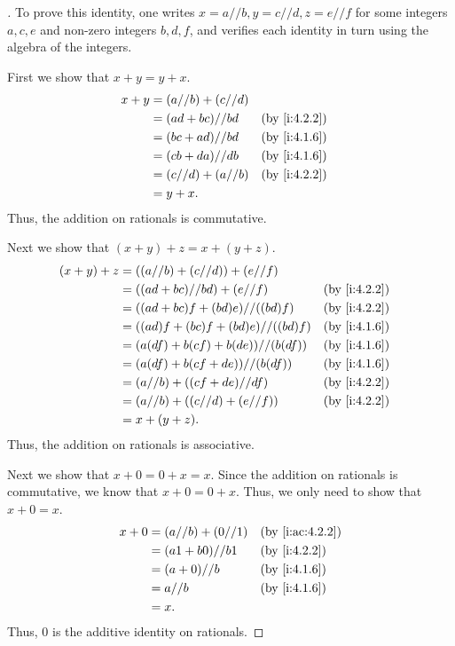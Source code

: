 \begin{proof}[]
  To prove this identity, one writes \(x = a // b, y = c // d, z = e // f\) for some integers \(a, c, e\) and non-zero integers \(b, d, f\), and verifies each identity in turn using the algebra of the integers.

  First we show that \(x + y = y + x\).
  \begin{align*}
    x + y & = (a // b) + (c // d)                   \\
          & = (ad + bc) // bd     &  & \by{i:4.2.2} \\
          & = (bc + ad) // bd     &  & \by{i:4.1.6} \\
          & = (cb + da) // db     &  & \by{i:4.1.6} \\
          & = (c // d) + (a // b) &  & \by{i:4.2.2} \\
          & = y + x.
  \end{align*}
  Thus, the addition on rationals is commutative.

  Next we show that \((x + y) + z = x + (y + z)\).
  \begin{align*}
    (x + y) + z & = ((a // b) + (c // d)) + (e // f)                     \\
                & = ((ad + bc) // bd) + (e // f)       &  & \by{i:4.2.2} \\
                & = ((ad + bc)f + (bd)e) // ((bd)f)    &  & \by{i:4.2.2} \\
                & = ((ad)f + (bc)f + (bd)e) // ((bd)f) &  & \by{i:4.1.6} \\
                & = (a(df) + b(cf) + b(de)) // (b(df)) &  & \by{i:4.1.6} \\
                & = (a(df) + b(cf + de)) // (b(df))    &  & \by{i:4.1.6} \\
                & = (a // b) + ((cf + de) // df)       &  & \by{i:4.2.2} \\
                & = (a // b) + ((c // d) + (e // f))   &  & \by{i:4.2.2} \\
                & = x + (y + z).
  \end{align*}
  Thus, the addition on rationals is associative.

  Next we show that \(x + 0 = 0 + x = x\).
  Since the addition on rationals is commutative, we know that \(x + 0 = 0 + x\).
  Thus, we only need to show that \(x + 0 = x\).
  \begin{align*}
    x + 0 & = (a // b) + (0 // 1) &  & \by{i:ac:4.2.2} \\
          & = (a1 + b0) // b1     &  & \by{i:4.2.2}    \\
          & = (a + 0) // b        &  & \by{i:4.1.6}    \\
          & = a // b              &  & \by{i:4.1.6}    \\
          & = x.
  \end{align*}
  Thus, \(0\) is the additive identity on rationals.


\end{proof}
